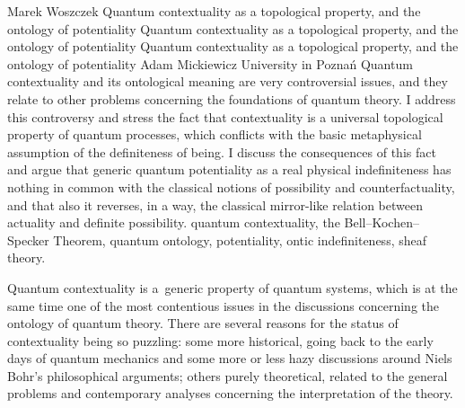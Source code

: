 \begin{artengenv}{Marek Woszczek}
	{Quantum contextuality as a topological property, and the ontology of potentiality}
	{Quantum contextuality as a topological property, and the ontology of potentiality}
	{Quantum contextuality as a topological property, and the ontology of potentiality}
	{Adam Mickiewicz University in Poznań}
	{Quantum contextuality and its ontological meaning are very controversial issues, and they relate to other problems concerning the foundations of quantum theory. I address this controversy and stress the fact that contextuality is a universal topological property of quantum processes, which conflicts with the basic metaphysical assumption of the definiteness of being. I discuss the consequences of this fact and argue that generic quantum potentiality as a real physical indefiniteness has nothing in common with the classical notions of possibility and counterfactuality, and that also it reverses, in a way, the classical mirror-like relation between actuality and definite possibility.}
	{quantum contextuality, the Bell–Kochen–Specker Theorem, quantum ontology, potentiality, ontic indefiniteness, sheaf theory.}



\lettrine[loversize=0.13,lines=2,lraise=-0.03,nindent=0em,findent=0.2pt]%
{Q}{}uantum contextuality is a~generic property of quantum systems, which is at the same time one of the most contentious issues in the discussions concerning the ontology of quantum theory. There are several reasons for the status of contextuality being so puzzling: some more historical, going back to the early days of quantum mechanics and some more or less hazy discussions around Niels Bohr's philosophical arguments; others purely theoretical, related to the general problems and contemporary analyses concerning the interpretation of the theory.


\end{artengenv}
